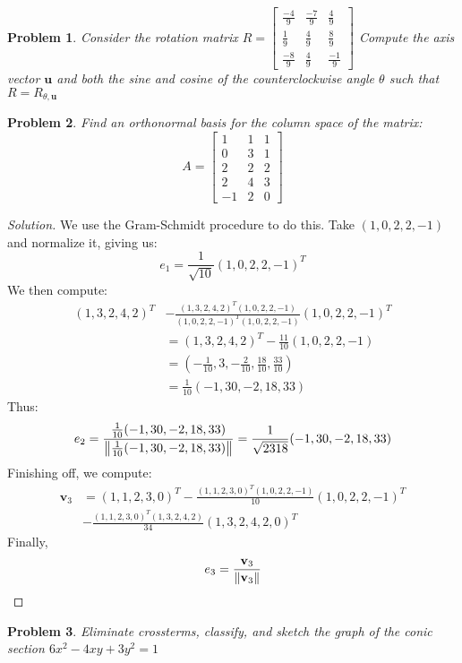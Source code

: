\documentclass{article}
\theoremstyle{mystyle}
\newtheorem{problem}{Problem}[section]
\begin{document}
\begin{problem}
Consider the rotation matrix $R = \begin{bmatrix} \frac{-4}{9} & \frac{-7}{9} & \frac{4}{9} \\ \frac{1}{9} & \frac{4}{9} & \frac{8}{9} \\ \frac{-8}{9} & \frac{4}{9} & \frac{-1}{9} \end{bmatrix}$ Compute the axis vector $\textbf{u}$ and both the sine and cosine of the counterclockwise angle $\theta$ such that $R = R_{\theta,\textbf{u}}$
\end{problem}
\begin{problem}
Find an orthonormal basis for the column space of the matrix:
\begin{equation*}
    A = \begin{bmatrix} 1 & 1 & 1 \\ 0 & 3 & 1 \\ 2 & 2 & 2 \\ 2 & 4 & 3 \\ -1 & 2 & 0 \end{bmatrix}
\end{equation*}
\end{problem}
\begin{proof}[Solution]
We use the Gram-Schmidt procedure to do this. Take $(1,0,2,2,-1)$ and normalize it, giving us:
\begin{equation*}
    e_{1} = \frac{1}{\sqrt{10}}(1,0,2,2,-1)^T    
\end{equation*}
We then compute:
\begin{align*}
    (1,3,2,4,2)^T &- \frac{(1,3,2,4,2)^T(1,0,2,2,-1)}{(1,0,2,2,-1)^T (1,0,2,2,-1)}(1,0,2,2,-1)^T\\
    &= (1,3,2,4,2)^T-\frac{11}{10}(1,0,2,2,-1)\\
    &=(-\frac{1}{10},3,-\frac{2}{10},\frac{18}{10},\frac{33}{10})\\
    &= \frac{1}{10}(-1,30,-2,18,33)
\end{align*}
Thus:
\begin{equation*}
    e_{2} = \frac{ \frac{1}{10}(-1,30,-2,18,33)}{\norm{ \frac{1}{10}(-1,30,-2,18,33)}} = \frac{1}{\sqrt{2318}}(-1,30,-2,18,33)
\end{equation*}
Finishing off, we compute:
\begin{align*}
    \mathbf{v}_{3} &= (1,1,2,3,0)^T - \frac{(1,1,2,3,0)^T(1,0,2,2,-1)}{10}(1,0,2,2,-1)^T\\
    &- \frac{(1,1,2,3,0)^T(1,3,2,4,2)}{34}(1,3,2,4,2,0)^T     
\end{align*}
Finally,
\begin{equation*}
    e_3 = \frac{\textbf{v}_3}{\norm{\textbf{v}_3}}
\end{equation*}
\end{proof}
\begin{problem}
Eliminate crossterms, classify, and sketch the graph of the conic section $6x^2 - 4xy+3y^2 = 1$
\end{problem}
\end{document}
